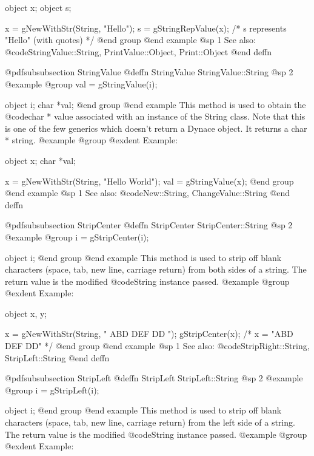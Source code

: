 object  x;
object  s;

x = gNewWithStr(String, "Hello");
s = gStringRepValue(x);
  /* s represents "Hello" (with quotes)  */
@end group
@end example
@sp 1
See also:  @code{StringValue::String, PrintValue::Object, Print::Object}
@end deffn











@pdfsubsubsection {StringValue}
@deffn {StringValue} StringValue::String
@sp 2
@example
@group
val = gStringValue(i);

object  i;
char    *val;
@end group
@end example
This method is used to obtain the @code{char *} value associated with an
instance of the String class.  Note that this is one of the few
generics which doesn't return a Dynace object.  It returns a char * string.
@example
@group
@exdent Example:

object  x;
char    *val;

x = gNewWithStr(String, "Hello World");
val = gStringValue(x);
@end group
@end example
@sp 1
See also:  @code{New::String, ChangeValue::String}
@end deffn






@pdfsubsubsection {StripCenter}
@deffn {StripCenter} StripCenter::String
@sp 2
@example
@group
i = gStripCenter(i);

object  i;
@end group
@end example
This method is used to strip off blank characters (space, tab, new line,
carriage return) from both sides of a string.  The return value is the
modified @code{String} instance passed.
@example
@group
@exdent Example:

object  x, y;

x = gNewWithStr(String, "    ABD  DEF  DD    ");
gStripCenter(x);   /*  x = "ABD  DEF  DD"    */
@end group
@end example
@sp 1
See also:  @code{StripRight::String, StripLeft::String}
@end deffn












@pdfsubsubsection {StripLeft}
@deffn {StripLeft} StripLeft::String
@sp 2
@example
@group
i = gStripLeft(i);

object  i;
@end group
@end example
This method is used to strip off blank characters (space, tab, new line,
carriage return) from the left side of a string.  The return value is the
modified @code{String} instance passed.
@example
@group
@exdent Example:

